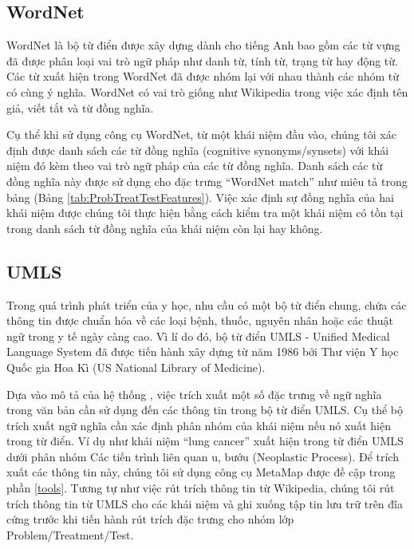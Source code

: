 \subsection*{WordNet}
WordNet là bộ từ điển được xây dựng dành cho tiếng Anh bao gồm các từ vựng đã được phân loại vai trò ngữ pháp như danh từ, tính từ, trạng từ hay động từ. Các từ xuất hiện trong WordNet đã được nhóm lại với nhau thành các nhóm từ có cùng ý nghĩa. WordNet có vai trò giống như Wikipedia trong việc xác định tên giả, viết tắt và từ đồng nghĩa.

Cụ thể khi sử dụng công cụ WordNet, từ một khái niệm đầu vào, chúng tôi xác định được danh sách các từ đồng nghĩa (cognitive synonyms/synsets) với khái niệm đó kèm theo vai trò ngữ pháp của các từ đồng nghĩa. Danh sách các từ đồng nghĩa này được sử dụng cho đặc trưng ``WordNet match'' như miêu tả trong bảng (Bảng \ref{tab:ProbTreatTestFeatures}). Việc xác định sự đồng nghĩa của hai khái niệm được chúng tôi thực hiện bằng cách kiểm tra một khái niệm có tồn tại trong danh sách từ đồng nghĩa của khái niệm còn lại hay không.

\subsection*{UMLS}
Trong quá trình phát triển của y học, nhu cầu có một bộ từ điển chung, chứa các thông tin được chuẩn hóa về các loại bệnh, thuốc, nguyên nhân hoặc các thuật ngữ trong y tế ngày càng cao. Vì lí do đó, bộ từ điển UMLS - Unified Medical Language System đã được tiến hành xây dựng từ năm 1986 bởi Thư viện Y học Quốc gia Hoa Kì (US National Library of Medicine).

Dựa vào mô tả của hệ thống \cite{YanXu2012}, việc trích xuất một số đặc trưng về ngữ nghĩa trong văn bản cần sử dụng đến các thông tin trong bộ từ điển UMLS. Cụ thể bộ trích xuất ngữ nghĩa cần xác định phân nhóm của khái niệm nếu nó xuất hiện trong từ điển. Ví dụ như khái niệm ``lung cancer'' xuất hiện trong từ điển UMLS dưới phân nhóm Các tiến trình liên quan u, bướu (Neoplastic Process). Để trích xuất các thông tin này, chúng tôi sử dụng công cụ MetaMap được đề cập trong phần \ref{tools}. Tương tự như việc rút trích thông tin từ Wikipedia, chúng tôi rút trích thông tin từ UMLS cho các khái niệm và ghi xuống tập tin lưu trữ trên đĩa cứng trước khi tiến hành rút trích đặc trưng cho nhóm lớp Problem/Treatment/Test.

